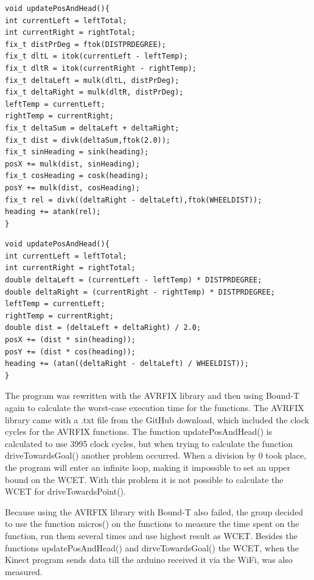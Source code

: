 \begin{lstlisting}[caption={The function updatePosAndHead with AWRFIX library}, label={Update1}]
void updatePosAndHead(){
int currentLeft = leftTotal;
int currentRight = rightTotal;
fix_t distPrDeg = ftok(DISTPRDEGREE);
fix_t dltL = itok(currentLeft - leftTemp);
fix_t dltR = itok(currentRight - rightTemp);
fix_t deltaLeft = mulk(dltL, distPrDeg);
fix_t deltaRight = mulk(dltR, distPrDeg);
leftTemp = currentLeft;
rightTemp = currentRight;
fix_t deltaSum = deltaLeft + deltaRight;
fix_t dist = divk(deltaSum,ftok(2.0));
fix_t sinHeading = sink(heading);
posX += mulk(dist, sinHeading);
fix_t cosHeading = cosk(heading);
posY += mulk(dist, cosHeading);
fix_t rel = divk((deltaRight - deltaLeft),ftok(WHEELDIST));
heading += atank(rel);
}
\end{lstlisting}

\begin{lstlisting}[caption={The function updatePosAndHead from the Arduino IDE}, label={Update2}]
void updatePosAndHead(){
int currentLeft = leftTotal;
int currentRight = rightTotal;
double deltaLeft = (currentLeft - leftTemp) * DISTPRDEGREE;
double deltaRight = (currentRight - rightTemp) * DISTPRDEGREE;
leftTemp = currentLeft;
rightTemp = currentRight;
double dist = (deltaLeft + deltaRight) / 2.0;
posX += (dist * sin(heading));
posY += (dist * cos(heading));
heading += (atan((deltaRight - deltaLeft) / WHEELDIST));
}
\end{lstlisting}

The program was rewritten with the AVRFIX library and then using Bound-T again to calculate the worst-case execution time for the functions. The AVRFIX library came with a .txt file from the GitHub download, which included the clock cycles for the AVRFIX functions. \newline
The function updatePosAndHead() is calculated to use 3995 clock cycles, but when trying to calculate the function driveTowardsGoal() another problem occurred. When a division by 0 took place, the program will enter an infinite loop, making it impossible to set an upper bound on the WCET. With this problem it is not possible to calculate the WCET for driveTowardsPoint().

Because using the AVRFIX library with Bound-T also failed, the group decided to use the function micros() on the functions to measure the time spent on the function, run them several times and use highest result as WCET. Besides the functions updatePosAndHead() and dirveTowardsGoal() the WCET, when the Kinect program sends data till the arduino received it via the WiFi, was also measured. 

